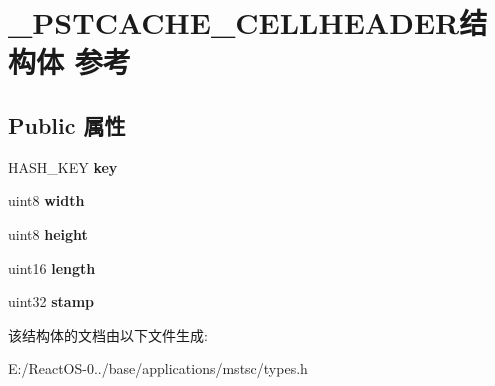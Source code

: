 \hypertarget{struct___p_s_t_c_a_c_h_e___c_e_l_l_h_e_a_d_e_r}{}\section{\+\_\+\+P\+S\+T\+C\+A\+C\+H\+E\+\_\+\+C\+E\+L\+L\+H\+E\+A\+D\+E\+R结构体 参考}
\label{struct___p_s_t_c_a_c_h_e___c_e_l_l_h_e_a_d_e_r}
\subsection*{Public 属性}
\begin{DoxyCompactItemize}
\item 
\mbox{\label{struct___p_s_t_c_a_c_h_e___c_e_l_l_h_e_a_d_e_r_a3002efb8a00f290bf7f0402ed6f41b79}} 
H\+A\+S\+H\+\_\+\+K\+EY {\bfseries key}
\item 
\mbox{\label{struct___p_s_t_c_a_c_h_e___c_e_l_l_h_e_a_d_e_r_aae4a210750be915b59cf907be8d42117}} 
uint8 {\bfseries width}
\item 
\mbox{\label{struct___p_s_t_c_a_c_h_e___c_e_l_l_h_e_a_d_e_r_adfdaa088da007c95440217bacdd9f90f}} 
uint8 {\bfseries height}
\item 
\mbox{\label{struct___p_s_t_c_a_c_h_e___c_e_l_l_h_e_a_d_e_r_a7a1d64fd3eec79bb924a2ae350b0d7b8}} 
uint16 {\bfseries length}
\item 
\mbox{\label{struct___p_s_t_c_a_c_h_e___c_e_l_l_h_e_a_d_e_r_a235e31d7de0181828b533b22a94e4247}} 
uint32 {\bfseries stamp}
\end{DoxyCompactItemize}


该结构体的文档由以下文件生成\+:\begin{DoxyCompactItemize}
\item 
E\+:/\+React\+O\+S-\/0../base/applications/mstsc/types.\+h\end{DoxyCompactItemize}
